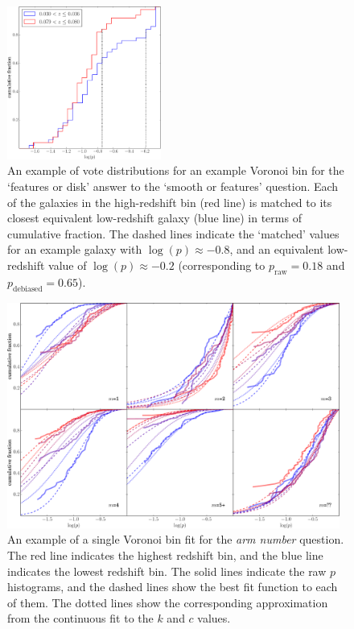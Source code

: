 \documentclass[useAMS,usenatbib]{mn2e}
\begin{document}
\begin{figure}
		\centering

        \includegraphics[width=0.45\textwidth]{Images/Bias/Debiasing/histogram_matching.pdf}

        \caption{An example of vote distributions for an example Voronoi bin for the `features or disk' answer to the `smooth or features' question. Each of the galaxies in the high-redshift bin (red line) is matched to its closest equivalent low-redshift galaxy (blue line) in terms of cumulative fraction. The dashed lines indicate the `matched' values for an example galaxy with $\log(p) \approx -0.8$, and an equivalent low-redshift value of $\log(p) \approx -0.2$ (corresponding to $p_{\mathrm{raw}}=0.18$ and $p_{\mathrm{debiased}}=0.65$).}

        \label{fig:histogram_matching}

\end{figure}

\begin{figure}
		\centering

        \includegraphics[width=0.975\textwidth]{Images/Bias/Debiasing/vbin_fit.pdf}

        \caption{An example of a single Voronoi bin fit for the \textit{arm number} question. The red line indicates the highest redshift bin, and the blue line indicates the lowest redshift bin. The solid lines indicate the raw $p$ histograms, and the dashed lines show the best fit function to each of them. The dotted lines show the corresponding approximation from the continuous fit to the $k$ and $c$ values.}

        \label{fig:function_fit}

\end{figure}
\end{document}
